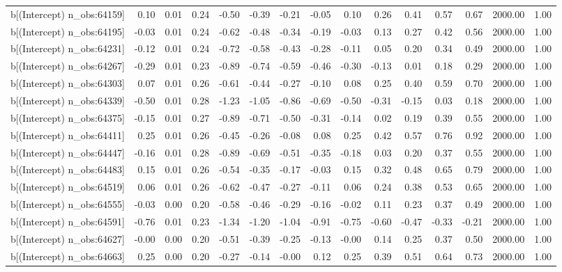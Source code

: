 \begin{table}[ht]
\begin{tabular}{rrrrrrrrrrrrrrr}
  b[(Intercept) n\_obs:64159] & 0.10 & 0.01 & 0.24 & -0.50 & -0.39 & -0.21 & -0.05 & 0.10 & 0.26 & 0.41 & 0.57 & 0.67 & 2000.00 & 1.00 \\ 
  b[(Intercept) n\_obs:64195] & -0.03 & 0.01 & 0.24 & -0.62 & -0.48 & -0.34 & -0.19 & -0.03 & 0.13 & 0.27 & 0.42 & 0.56 & 2000.00 & 1.00 \\ 
  b[(Intercept) n\_obs:64231] & -0.12 & 0.01 & 0.24 & -0.72 & -0.58 & -0.43 & -0.28 & -0.11 & 0.05 & 0.20 & 0.34 & 0.49 & 2000.00 & 1.00 \\ 
  b[(Intercept) n\_obs:64267] & -0.29 & 0.01 & 0.23 & -0.89 & -0.74 & -0.59 & -0.46 & -0.30 & -0.13 & 0.01 & 0.18 & 0.29 & 2000.00 & 1.00 \\ 
  b[(Intercept) n\_obs:64303] & 0.07 & 0.01 & 0.26 & -0.61 & -0.44 & -0.27 & -0.10 & 0.08 & 0.25 & 0.40 & 0.59 & 0.70 & 2000.00 & 1.00 \\ 
  b[(Intercept) n\_obs:64339] & -0.50 & 0.01 & 0.28 & -1.23 & -1.05 & -0.86 & -0.69 & -0.50 & -0.31 & -0.15 & 0.03 & 0.18 & 2000.00 & 1.00 \\ 
  b[(Intercept) n\_obs:64375] & -0.15 & 0.01 & 0.27 & -0.89 & -0.71 & -0.50 & -0.31 & -0.14 & 0.02 & 0.19 & 0.39 & 0.55 & 2000.00 & 1.00 \\ 
  b[(Intercept) n\_obs:64411] & 0.25 & 0.01 & 0.26 & -0.45 & -0.26 & -0.08 & 0.08 & 0.25 & 0.42 & 0.57 & 0.76 & 0.92 & 2000.00 & 1.00 \\ 
  b[(Intercept) n\_obs:64447] & -0.16 & 0.01 & 0.28 & -0.89 & -0.69 & -0.51 & -0.35 & -0.18 & 0.03 & 0.20 & 0.37 & 0.55 & 2000.00 & 1.00 \\ 
  b[(Intercept) n\_obs:64483] & 0.15 & 0.01 & 0.26 & -0.54 & -0.35 & -0.17 & -0.03 & 0.15 & 0.32 & 0.48 & 0.65 & 0.79 & 2000.00 & 1.00 \\ 
  b[(Intercept) n\_obs:64519] & 0.06 & 0.01 & 0.26 & -0.62 & -0.47 & -0.27 & -0.11 & 0.06 & 0.24 & 0.38 & 0.53 & 0.65 & 2000.00 & 1.00 \\ 
  b[(Intercept) n\_obs:64555] & -0.03 & 0.00 & 0.20 & -0.58 & -0.46 & -0.29 & -0.16 & -0.02 & 0.11 & 0.23 & 0.37 & 0.49 & 2000.00 & 1.00 \\ 
  b[(Intercept) n\_obs:64591] & -0.76 & 0.01 & 0.23 & -1.34 & -1.20 & -1.04 & -0.91 & -0.75 & -0.60 & -0.47 & -0.33 & -0.21 & 2000.00 & 1.00 \\ 
  b[(Intercept) n\_obs:64627] & -0.00 & 0.00 & 0.20 & -0.51 & -0.39 & -0.25 & -0.13 & -0.00 & 0.14 & 0.25 & 0.37 & 0.50 & 2000.00 & 1.00 \\ 
  b[(Intercept) n\_obs:64663] & 0.25 & 0.00 & 0.20 & -0.27 & -0.14 & -0.00 & 0.12 & 0.25 & 0.39 & 0.51 & 0.64 & 0.73 & 2000.00 & 1.00 \\ 

\end{tabular}
\end{table}
